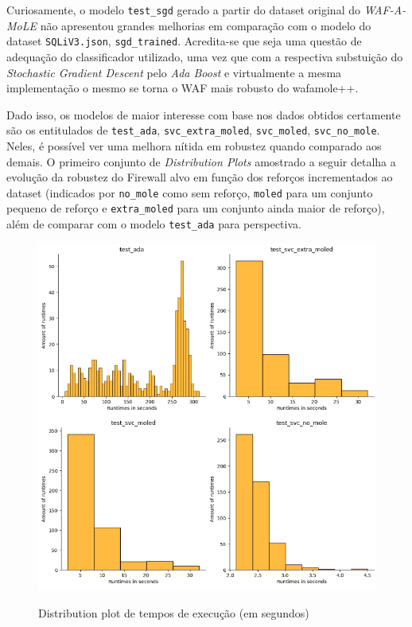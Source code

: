 Curiosamente, o modelo \verb+test_sgd+ gerado a partir do dataset original do \textit{WAF-A-MoLE} não apresentou grandes melhorias em comparação com o modelo do dataset \verb+SQLiV3.json+, \verb+sgd_trained+. Acredita-se que seja uma questão de adequação do classificador utilizado, uma vez que com a respectiva substuição do \textit{Stochastic Gradient Descent} pelo \textit{Ada Boost} e virtualmente a mesma implementação o mesmo se torna o WAF mais robusto do wafamole++.

Dado isso, os modelos de maior interesse com base nos dados obtidos certamente são os entitulados de \verb+test_ada+, \verb+svc_extra_moled+, \verb+svc_moled+, \verb+svc_no_mole+. Neles, é possível ver uma melhora nítida em robustez quando comparado aos demais. O primeiro conjunto de \textit{Distribution Plots} amostrado a seguir detalha a evolução da robustez do Firewall alvo em função dos reforços incrementados ao dataset (indicados por \verb+no_mole+ como sem reforço, \verb+moled+ para um conjunto pequeno de reforço e \verb+extra_moled+ para um conjunto ainda maior de reforço), além de comparar com o modelo \verb+test_ada+ para perspectiva. 

\begin{figure}[ht]
    \centering
    \caption{Distribution plot de tempos de execução (em segundos)}
    \includegraphics[width=18cm]{figuras/graficos/runtimes_amount_set1.png} 
    \label{fig:mole-evolution} 
\end{figure}

